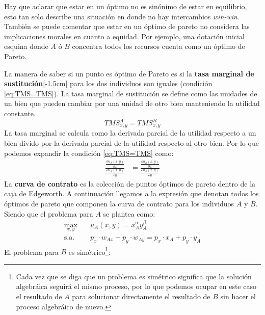 Hay que aclarar que estar en un óptimo no es sinónimo de estar en equilibrio, esto tan solo describe una situación en donde no hay intercambios \textit{win-win}. También se puede comentar que estar en un óptimo de pareto no considera las implicaciones morales en cuanto a equidad. Por ejemplo, una dotación inicial esquina donde $A$ ó $B$ concentra todos los recursos cuenta como un óptimo de Pareto.

La manera de saber si un punto es óptimo de Pareto es si la \textbf{tasa marginal de sustitución}[-1.5cm] para los dos individuos son iguales (condición \ref{eq:TMS=TMS}). La tasa marginal de sustitución se define como las unidades de un bien que pueden cambiar por una unidad de otro bien manteniendo la utilidad constante.
\begin{equation}
    TMS_{x,y}^A = TMS_{x,y}^B \label{eq:TMS=TMS}
\end{equation}
La tasa marginal se calcula como la derivada parcial de la utilidad respecto a un bien divido por la derivada parcial de la utilidad respecto al otro bien. Por lo que podemos expandir la condición \ref{eq:TMS=TMS} como: 
\begin{align*}
    \frac{    \frac{\partial u_A(x,y)}{\partial x}       }{      \frac{\partial u_A(x,y)}{\partial y}     } & =  \frac{    \frac{\partial u_B(x,y)}{\partial x}       }{      \frac{\partial u_B(x,y)}{\partial y}     } 
\end{align*}
La \textbf{curva de contrato} es la colección de puntos óptimos de pareto dentro de la caja de Edgeworth. A continuación llegamos a la expresión que denotan todos los óptimos de pareto que componen la curva de contrato para los individuos $A$ y $B$. Siendo que el problema para $A$ se plantea como:
\begin{align*}
    \max_{x,y} &\quad u_A(x,y) = x_A^\alpha y_A^{\beta}\quad \\
    \text{s.a.} &\quad p_x \cdot w_{Ax} + p_y \cdot w_{Ay} = p_x \cdot x_A + p_y \cdot y_A
\end{align*}
El problema para $B$ es simétrico\footnote{Cada vez que se diga que un problema es simétrico significa que la solución algebráica seguirá el mismo proceso, por lo que podemos ocupar en este caso el resultado de $A$ para solucionar directamente el resultado de $B$ sin hacer el proceso algebráico de nuevo.}:
